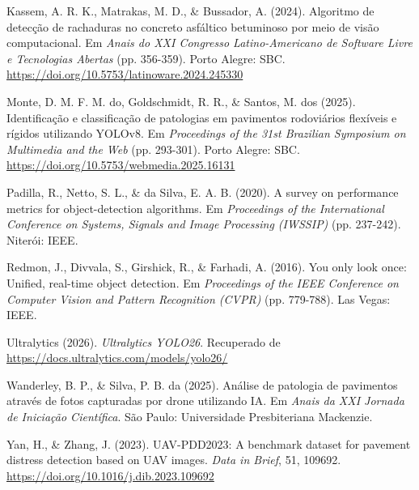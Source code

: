\documentclass[12pt]{article}
\newenvironment{referencias}{%
  \begin{list}{}{%
    \setlength{\leftmargin}{1.25cm}%
    \setlength{\itemindent}{-1.25cm}%
    \setlength{\labelwidth}{0pt}%
    \setlength{\labelsep}{0pt}%
    \setlength{\itemsep}{6pt}%
    \setlength{\parsep}{0pt}%
    \setlength{\topsep}{6pt}}}%
  {\end{list}}
\begin{document}
\begin{referencias}
\item Kassem, A. R. K., Matrakas, M. D., \& Bussador, A. (2024).
Algoritmo de detecção de rachaduras no concreto asfáltico betuminoso por
meio de visão computacional. Em \emph{Anais do XXI Congresso
Latino-Americano de Software Livre e Tecnologias Abertas} (pp. 356-359).
Porto Alegre: SBC.
\url{https://doi.org/10.5753/latinoware.2024.245330}

\item Monte, D. M. F. M. do, Goldschmidt, R. R., \& Santos, M. dos
(2025). Identificação e classificação de patologias em pavimentos
rodoviários flexíveis e rígidos utilizando YOLOv8. Em \emph{Proceedings
of the 31st Brazilian Symposium on Multimedia and the Web} (pp.
293-301). Porto Alegre: SBC.
\url{https://doi.org/10.5753/webmedia.2025.16131}

\item Padilla, R., Netto, S. L., \& da Silva, E. A. B. (2020). A survey
on performance metrics for object-detection algorithms. Em
\emph{Proceedings of the International Conference on Systems, Signals and
Image Processing (IWSSIP)} (pp. 237-242). Niterói: IEEE.

\item Redmon, J., Divvala, S., Girshick, R., \& Farhadi, A. (2016). You
only look once: Unified, real-time object detection. Em
\emph{Proceedings of the IEEE Conference on Computer Vision and Pattern
Recognition (CVPR)} (pp. 779-788). Las Vegas: IEEE.

\item Ultralytics (2026). \emph{Ultralytics YOLO26}. Recuperado de
\url{https://docs.ultralytics.com/models/yolo26/}

\item Wanderley, B. P., \& Silva, P. B. da (2025). Análise de patologia
de pavimentos através de fotos capturadas por drone utilizando IA. Em
\emph{Anais da XXI Jornada de Iniciação Científica}. São Paulo:
Universidade Presbiteriana Mackenzie.

\item Yan, H., \& Zhang, J. (2023). UAV-PDD2023: A benchmark dataset for
pavement distress detection based on UAV images. \emph{Data in Brief},
51, 109692. \url{https://doi.org/10.1016/j.dib.2023.109692}

\end{referencias}
\end{document}
